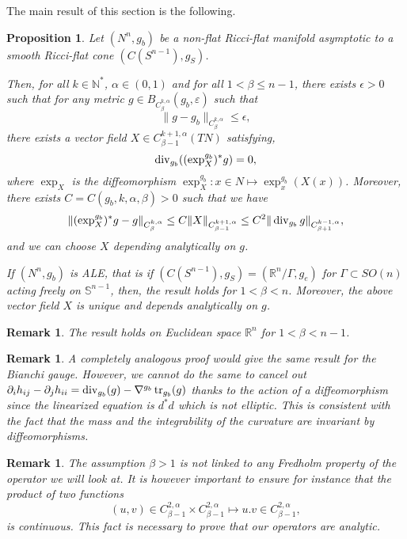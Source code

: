 \documentclass[a4paper,11pt,reqno]{amsart}
\newtheorem{prop}[defn]{Proposition}
\newtheorem{rk}[defn]{Remark}
\def\RR{\mathbb{R}}
\def\tr{\mathop{\rm tr}\nolimits}
\def\div{\mathop{\rm div}\nolimits}
\def\tr{\mathop{\rm tr}\nolimits}
\def\div{\mathop{\rm div}\nolimits}
\numberwithin{equation}{section}
\begin{document}
	The main result of this section is the following.
	\begin{prop}\label{prop-gauge-div-free}
		Let $(N^n,g_b)$ be a non-flat Ricci-flat manifold asymptotic to a smooth Ricci-flat cone $(C(S^{n-1}),g_S)$.
		
		Then, for all $k\in \mathbb{N}^*$, $\alpha\in(0,1)$ and for all $1<\beta\leq n-1$, there exists $\epsilon>0$ such that for any metric $g\in B_{C^{k,\alpha}_{\beta}}(g_b,\varepsilon)$ such that
		\begin{equation*}
		\|g-g_b\|_{C^{k,\alpha}_{\beta}}\leq \epsilon,
		\end{equation*}
		there exists a vector field $X\in C^{k+1,\alpha}_{\beta-1}(TN)$ satisfying, 
		\begin{equation*}
		\div_{g_b}((\exp^{g_b}_X)^*g)=0,
		\end{equation*}
		where $\exp_X$ is the diffeomorphism $\exp^{g_b}_X : x\in N \mapsto \exp_x^{g_b}(X(x))$. Moreover, there exists $C = C(g_b,k,\alpha,\beta)>0$ such that we have
		$$\|(\exp^{g_b}_X)^*g-g\|_{C^{k,\alpha}_{\beta}}\leq C\|X\|_{C^{k+1,\alpha}_{\beta-1}}\leq C^2 \|\div_{g_b}g\|_{C^{k-1,\alpha}_{\beta+1}},$$
		and we can choose $X$ depending analytically on $g$. 
		
		If $(N^n,g_b)$ is ALE, that is if $(C(S^{n-1}),g_S) = (\mathbb{R}^n\slash\Gamma,g_e)$ for $\Gamma\subset SO(n)$ acting freely on $\mathbb{S}^{n-1}$, then, the result holds for $1<\beta< n$. Moreover, the above vector field $X$ is unique and depends analytically on $g$.
	\end{prop}
	\begin{rk}
		The result holds on Euclidean space $\RR^n$ for $1<\beta< n-1$.
	\end{rk}
	\begin{rk}
		A completely analogous proof would give the same result for the Bianchi gauge. However, we cannot do the same to cancel out $\partial_i h_{ij} - \partial_j h_{ii} = \div_{g_b}(g) - \nabla^{g_b} \tr_{g_b}(g)$ thanks to the action of a diffeomorphism since the linearized equation is $d^*d$ which is not elliptic. This is consistent with the fact that the mass and the integrability of the curvature are invariant by diffeomorphisms.
	\end{rk}
	\begin{rk}	
		The assumption $\beta>1$ is not linked to any Fredholm property of the operator we will look at. It is however important to ensure for instance that the product of two functions $$(u,v)\in C^{2,\alpha}_{\beta-1}\times C^{2,\alpha}_{\beta-1} \mapsto u.v\in C^{2,\alpha}_{\beta-1},$$ is continuous. This fact is necessary to prove that our operators are analytic.
	\end{rk}
\end{document}
